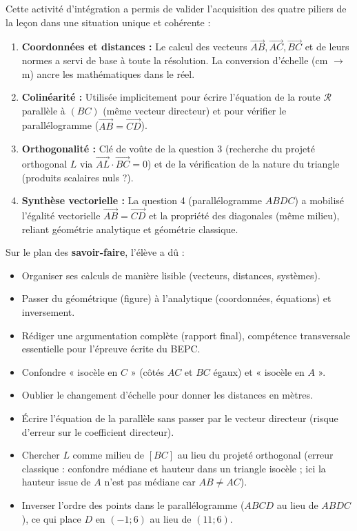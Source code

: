 \documentclass[11pt]{article}
\newcounter{popsec}
\newcounter{popsub}
\newcommand{\courssub}[1]{%
  \stepcounter{popsub}%
  \par\vspace{9pt}\noindent{\popxbold\fontsize{11.5}{13}\selectfont\color{popink}{\color{poporange}\thepopsec.\thepopsub}\hspace{6pt}#1}\par\nopagebreak\vspace{4pt}
}
\begin{document}
\courssub{Bilan de l'activité}
Cette activité d'intégration a permis de valider l'acquisition des quatre piliers de la leçon dans une situation unique et cohérente :
\begin{enumerate}
    \item \textbf{Coordonnées et distances :} Le calcul des vecteurs $\vec{AB}, \vec{AC}, \vec{BC}$ et de leurs normes a servi de base à toute la résolution. La conversion d'échelle (cm $\to$ m) ancre les mathématiques dans le réel.
    \item \textbf{Colinéarité :} Utilisée implicitement pour écrire l'équation de la route $\mathcal{R}$ parallèle à $(BC)$ (même vecteur directeur) et pour vérifier le parallélogramme ($\vec{AB}=\vec{CD}$).
    \item \textbf{Orthogonalité :} Clé de voûte de la question 3 (recherche du projeté orthogonal $L$ via $\vec{AL}\cdot\vec{BC}=0$) et de la vérification de la nature du triangle (produits scalaires nuls ?).
    \item \textbf{Synthèse vectorielle :} La question 4 (parallélogramme $ABDC$) a mobilisé l'égalité vectorielle $\vec{AB}=\vec{CD}$ et la propriété des diagonales (même milieu), reliant géométrie analytique et géométrie classique.
\end{enumerate}
Sur le plan des \textbf{savoir-faire}, l'élève a dû :
\begin{itemize}
    \item Organiser ses calculs de manière lisible (vecteurs, distances, systèmes).
    \item Passer du géométrique (figure) à l'analytique (coordonnées, équations) et inversement.
    \item Rédiger une argumentation complète (rapport final), compétence transversale essentielle pour l'épreuve écrite du BEPC.
\end{itemize}
\begin{attention}
\begin{itemize}
    \item Confondre « isocèle en $C$ » (côtés $AC$ et $BC$ égaux) et « isocèle en $A$ ».
    \item Oublier le changement d'échelle pour donner les distances en mètres.
    \item Écrire l'équation de la parallèle sans passer par le vecteur directeur (risque d'erreur sur le coefficient directeur).
    \item Chercher $L$ comme milieu de $[BC]$ au lieu du projeté orthogonal (erreur classique : confondre médiane et hauteur dans un triangle isocèle ; ici la hauteur issue de $A$ n'est pas médiane car $AB \neq AC$).
    \item Inverser l'ordre des points dans le parallélogramme ($ABCD$ au lieu de $ABDC$), ce qui place $D$ en $(-1;6)$ au lieu de $(11;6)$.
\end{itemize}
\end{attention}
\end{document}
